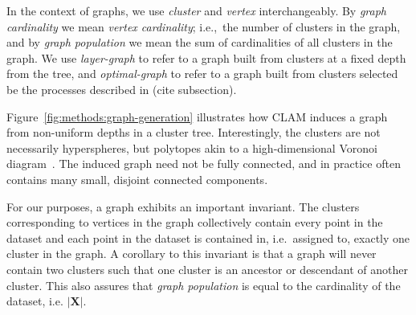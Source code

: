 In the context of graphs, we use \textit{cluster} and \textit{vertex} interchangeably.
By \textit{graph cardinality} we mean \textit{vertex cardinality}; i.e.,\ the number of clusters in the graph, and by \textit{graph population} we mean the sum of cardinalities of all clusters in the graph.
We use \textit{layer-graph} to refer to a graph built from clusters at a fixed depth from the tree, and \textit{optimal-graph} to refer to a graph built from clusters selected be the processes described in (cite subsection).

Figure~\ref{fig:methods:graph-generation} illustrates how CLAM induces a graph from non-uniform depths in a cluster tree.
Interestingly, the clusters are not necessarily hyperspheres, but polytopes akin to a high-dimensional Voronoi diagram~\cite{voronoi1908nouvelles}.
The induced graph need not be fully connected, and in practice often contains many small, disjoint connected components.

For our purposes, a graph exhibits an important invariant.
The clusters corresponding to vertices in the graph collectively contain every point in the dataset and each point in the dataset is contained in, i.e.\ assigned to, exactly one cluster in the graph.
A corollary to this invariant is that a graph will never contain two clusters such that one cluster is an ancestor or descendant of another cluster.
This also assures that \textit{graph population} is equal to the cardinality of the dataset, i.e. $|\textbf{X}|$.



